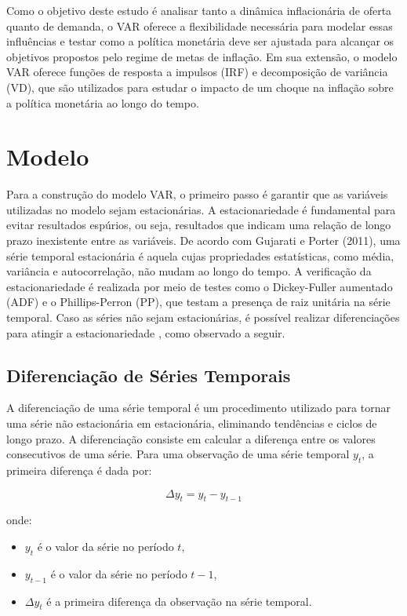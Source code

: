 \documentclass[12pt,oneside,a4paper,chapter=TITLE,english,brazil,sumario=abnt-6027-2012]{abntex2}
\begin{document}
Como o objetivo deste estudo é analisar tanto a dinâmica inflacionária de oferta quanto de demanda, o VAR oferece a flexibilidade necessária para modelar essas influências e testar como a política monetária deve ser ajustada para alcançar os objetivos propostos pelo regime de metas de inflação. Em sua extensão, o modelo VAR oferece funções de resposta a impulsos (IRF) e decomposição de variância (VD), que são utilizados para estudar o impacto de um choque na inflação sobre a política monetária ao longo do tempo.

\section{Modelo}

Para a construção do modelo VAR, o primeiro passo é garantir que as variáveis utilizadas no modelo sejam estacionárias. A estacionariedade é fundamental para evitar resultados espúrios, ou seja, resultados que indicam uma relação de longo prazo inexistente entre as variáveis. De acordo com Gujarati e Porter (2011), uma série temporal estacionária é aquela cujas propriedades estatísticas, como média, variância e autocorrelação, não mudam ao longo do tempo. A verificação da estacionariedade é realizada por meio de testes como o Dickey-Fuller aumentado (ADF) e o Phillips-Perron (PP), que testam a presença de raiz unitária na série temporal. Caso as séries não sejam estacionárias, é possível realizar diferenciações para atingir a estacionariedade \cite{gujarati_porter_2011}, como observado a seguir.

\subsection{Diferenciação de Séries Temporais}

A diferenciação de uma série temporal é um procedimento utilizado para tornar uma série não estacionária em estacionária, eliminando tendências e ciclos de longo prazo. A diferenciação consiste em calcular a diferença entre os valores consecutivos de uma série. Para uma observação de uma série temporal \( y_t \), a primeira diferença é dada por:

\begin{equation}
	\Delta y_t = y_t - y_{t-1}
\end{equation}

onde:

\begin{itemize}
	\item \( y_t \) é o valor da série no período \( t \),
	\item \( y_{t-1} \) é o valor da série no período \( t-1 \),
	\item \( \Delta y_t \) é a primeira diferença da observação na série temporal.
\end{itemize}
\end{document}
